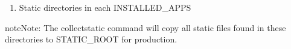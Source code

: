 \documentclass[letterpaper,10pt,english]{sphinxmanual}
\begin{document}
\begin{fulllineitems}
\begin{description}
\begin{enumerate}
\item {} 
\sphinxAtStartPar
Static directories in each INSTALLED\_APPS

\end{enumerate}

\end{description}

\begin{sphinxadmonition}{note}{Note:}
\sphinxAtStartPar
The collectstatic command will copy all static files found
in these directories to STATIC\_ROOT for production.
\end{sphinxadmonition}

\end{fulllineitems}

\end{document}
